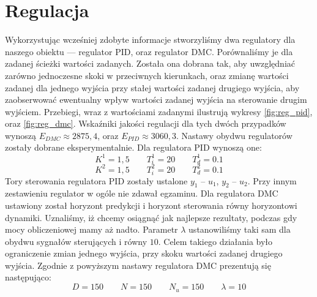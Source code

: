 \chapter{Regulacja}
Wykorzystując wcześniej zdobyte informacje stworzyliśmy dwa regulatory dla naszego
obiektu --- regulator PID, oraz regulator DMC. Porównaliśmy je dla zadanej ścieżki
wartości zadanych. Została ona dobrana tak, aby uwzględniać zarówno jednoczesne
skoki w przeciwnych kierunkach, oraz zmianę wartości zadanej dla jednego wyjścia
przy stałej wartości zadanej drugiego wyjścia, aby zaobserwować ewentualny wpływ
wartości zadanej wyjścia na sterowanie drugim wyjściem. Przebiegi, wraz z wartościami
zadanymi ilustrują wykresy \ref{fig:reg_pid}, oraz \ref{fig:reg_dmc}. Wskaźniki
jakości regulacji dla tych dwóch przypadków wynoszą $E_{DMC} \approx 2875,4$,
oraz $E_{PID} \approx 3060,3$. Nastawy obydwu regulatorów zostały dobrane
eksperymentalnie. Dla regulatora PID wynoszą one:
\begin{equation}
  K^1 = 1,5 \qquad T^1_i = 20 \qquad T^1_d = 0.1
\end{equation}
\begin{equation}
  K^2 = 1,5 \qquad T^2_i = 20 \qquad T^2_d = 0.1
\end{equation}
Tory sterowania regulatora PID zostały ustalone $y_1$ -- $u_1$, $y_2$ -- $u_2$.
Przy innym zestawieniu regulator w ogóle nie zdawał egzaminu.
Dla regulatora DMC ustawiony został horyzont predykcji i horyzont sterowania
równy horyzontowi dynamiki. Uznaliśmy, iż chcemy osiągnąć jak najlepsze rezultaty,
podczas gdy mocy obliczeniowej mamy aż nadto. Parametr $\lambda$ ustanowiliśmy
taki sam dla obydwu sygnałów sterujących i równy $10$. Celem takiego działania
było ograniczenie zmian jednego wyjścia, przy skoku wartości zadanej
drugiego wyjścia. Zgodnie z powyższym nastawy regulatora DMC prezentują się
następująco:
\begin{equation}
  D = 150 \qquad N = 150 \qquad N_u = 150 \qquad \lambda = 10
\end{equation}

